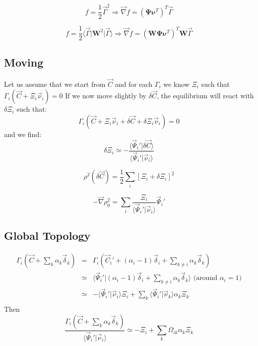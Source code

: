 \documentclass[aps,12pt]{revtex4}
\begin{document}
\begin{equation}
	f = \dfrac{1}{2} \vec{\Gamma}^2 \Rightarrow \vec{\nabla} f = \left(\bm{\Psi} \bm{\nu}^T\right)^T \vec{\Gamma}
\end{equation}

\begin{equation}
	f = \dfrac{1}{2} \langle \vec{\Gamma} \vert \bm{W}^2 \vert \vec{\Gamma} \rangle \Rightarrow \vec{\nabla} f = \left(\bm{W}\bm{\Psi} \bm{\nu}^T\right)^T \bm{W}\vec{\Gamma}
\end{equation}

\subsection{Moving}

Let us assume that we start from $\vec{C}$ and for each $\Gamma_i$ we know $\Xi_i$ such that $\Gamma_i(\vec{C} + \Xi_i \vec{\nu}_i) =0$
If we now move slightly by $\delta\vec{C}$, the equilibrium will react with $\delta\Xi_i$ such that:
\begin{equation}
	\Gamma_i(\vec{C} + \Xi_i \vec{\nu}_i + \delta\vec{C} + \delta\Xi_i \vec{\nu}_i) = 0
\end{equation}
and we find:
\begin{equation}
	\delta \Xi_i \simeq - \dfrac{\langle \vec{\Psi}_i' \vert \delta\vec{C}\rangle}{\langle \vec{\Psi}_i' \vert \vec{\nu}_i \rangle}
\end{equation}
 
\begin{equation}
	\rho^2(\delta\vec{C}) = \dfrac{1}{2} \sum_i \left[ \Xi_i + \delta\Xi_i \right]^2
\end{equation} 

\begin{equation}
	- \vec{\nabla} \rho^2_0 = \sum_i \dfrac{\Xi_i}{\langle \vec{\Psi}_i' \vert \vec{\nu}_i \rangle} \vec{\Psi}_i'
\end{equation}


\subsection{Global Topology}

\begin{equation}
\begin{array}{rcl}
	\Gamma_i \left(\vec{C} + \sum_k \alpha_k \vec{\delta}_k \right) & = & 
	\Gamma_i \left(\vec{C}_i' + (\alpha_i-1) \vec{\delta}_i + \sum_{k\not=i} \alpha_k \vec{\delta}_k \right)\\
	& \simeq & \langle \vec{\Psi}_i' \vert (\alpha_i-1) \vec{\delta}_i + \sum_{k\not=i} \alpha_k \vec{\delta}_k \rangle \text{ (around $\alpha_i=1$)}\\
	& \simeq & -\langle \vec{\Psi}_i'\vert \vec{\nu}_i \rangle \Xi_i + \sum_k \langle \vec{\Psi}_i'\vert \vec{\nu}_k \rangle \alpha_k \Xi_k \\
\end{array}
\end{equation}
Then
\begin{equation}
	\dfrac{\Gamma_i\left(\vec{C} + \sum_k \alpha_k \vec{\delta}_k \right)}{\langle \vec{\Psi}_i'\vert \vec{\nu}_i \rangle} \simeq
	-\Xi_i + \sum_k \Omega_{ik} \alpha_k \Xi_k
\end{equation}
\end{document}
